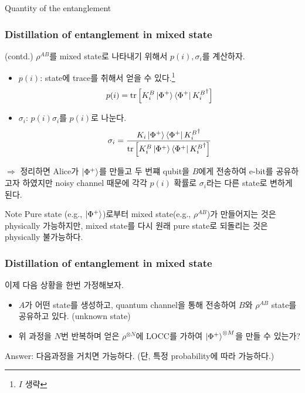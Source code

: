 \documentclass[9pt]{beamer}
\begin{document}
\begin{section}{Quantity of the entanglement}
        \begin{frame}
            \frametitle{Distillation of entanglement in mixed state}
            (contd.) $\rho^{AB}$를 mixed state로 나타내기 위해서 $p(i), \sigma_i$를 계산하자.
            \begin{itemize}
                \item $p(i)$: state에 trace를 취해서 얻을 수 있다.\footnote{$I$ 생략}
                \begin{equation*}
                    p(i) = \text{tr}\left[ K_i^B \ket{\Phi^+} \bra{\Phi^+} {K_i^B}^\dagger\right]
                \end{equation*}
                \item $\sigma_i$: $p(i) \sigma_i$를 $p(i)$로 나눈다.
                \begin{equation*}
                    \sigma_i = \frac{K_i \ket{\Phi^+} \bra{\Phi^+} {K_i^B}^\dagger}{\text{tr}\left[ K_i^B \ket{\Phi^+} \bra{\Phi^+} {K_i^B}^\dagger\right]} 
                \end{equation*}
            \end{itemize}
            $\Rightarrow$ 정리하면 Alice가 $\ket{\Phi^+}$를 만들고 두 번쨰 qubit을 $B$에게 전송하여 e-bit를 공유하고자 하였지만 noisy channel 때문에 각각 $p(i)$ 확률로 $\sigma_i$라는 다른 state로 변하게 된다.
            \begin{block}{Note}
                Pure state (e.g., $\ket{\Phi^+}$)로부터 mixed state(e.g., $\rho^{AB}$)가 만들어지는 것은 physically 가능하지만, mixed state를 다시 원래 pure state로 되돌리는 것은 physically 불가능하다.
            \end{block}
        \end{frame}

        \begin{frame}
            \frametitle{Distillation of entanglement in mixed state}
            이제 다음 상황을 한번 가정해보자.
            \begin{itemize}
                \item $A$가 어떤 state를 생성하고, quantum channel을 통해 전송하여 $B$와 $\rho^{AB}$ state를 공유하고 있다. (unknown state)
                \item 위 과정을 $N$번 반복하며 얻은 $\rho^{\otimes N}$에 LOCC를 가하여 $\ket{\Phi^+}^{\otimes M}$을 만들 수 있는가?
            \end{itemize}
            \vspace{0.2cm}
            Answer: 다음과정을 거치면 가능하다. (단, 특정 probability에 따라 가능하다.)
            

\end{frame}
\end{section}
\end{document}

